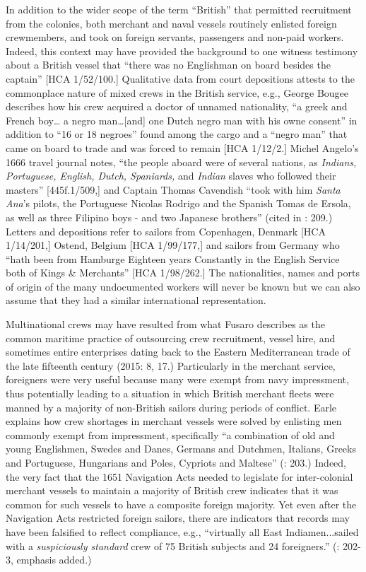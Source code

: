   In addition to the wider scope of the term “British” that permitted recruitment from the colonies, both merchant and naval vessels routinely enlisted foreign crewmembers, and took on foreign servants, passengers and non-paid workers. Indeed, this context may have provided the background to one witness testimony about a British vessel that “there was no Englishman on board besides the captain” [HCA 1/52/100.] Qualitative data from court depositions attests to the commonplace nature of mixed crews in the British service, e.g., George Bougee describes how his crew acquired a doctor of unnamed nationality, “a greek and French boy… a negro man…[and] one Dutch negro man with his owne consent” in addition to “16 or 18 negroes” found among the cargo and a “negro man” that came on board to trade and was forced to remain [HCA 1/12/2.] Michel Angelo’s 1666 travel journal notes, “the people aboard were of several nations, as \textit{Indians, Portuguese, English, Dutch, Spaniards,} and \textit{Indian} slaves who followed their masters” [445f.1/509,] and Captain Thomas Cavendish “took with him \textit{Santa Ana}’s pilots, the Portuguese Nicolas Rodrigo and the Spanish Tomas de Ersola, as well as three Filipino boys - and two Japanese brothers” (cited in \citealt{Bicheno2012}: 209.) Letters and depositions refer to sailors from Copenhagen, Denmark [HCA 1/14/201,] Ostend, Belgium [HCA 1/99/177,] and sailors from Germany who “hath been from Hamburge Eighteen years Constantly in the English Service both of Kings \& Merchants” [HCA 1/98/262.] The nationalities, names and ports of origin of the many undocumented workers will never be known but we can also assume that they had a similar international representation.

Multinational crews may have resulted from what Fusaro describes as the common maritime practice of outsourcing crew recruitment, vessel hire, and sometimes entire enterprises dating back to the Eastern Mediterranean trade of the late fifteenth century (2015: 8, 17.) Particularly in the merchant service, foreigners were very useful because many were exempt from navy impressment, thus potentially leading to a situation in which British merchant fleets were manned by a majority of non-British sailors during periods of conflict. Earle explains how crew shortages in merchant vessels were solved by enlisting men commonly exempt from impressment, specifically “a combination of old and young Englishmen, Swedes and Danes, Germans and Dutchmen, Italians, Greeks and Portuguese, Hungarians and Poles, Cypriots and Maltese” (\citealt{Earle1998}: 203.) Indeed, the very fact that the 1651 Navigation Acts needed to legislate for inter-colonial merchant vessels to maintain a majority of British crew indicates that it was common for such vessels to have a composite foreign majority. Yet even after the Navigation Acts restricted foreign sailors, there are indicators that records may have been falsified to reflect compliance, e.g., “virtually all East Indiamen...sailed with a \textit{suspiciously standard} crew of 75 British subjects and 24 foreigners.” (\citealt{Earle1998}: 202-3, emphasis added.) 

